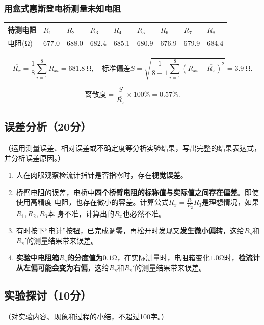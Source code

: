 \documentclass{../../templates/Report}%
\begin{document}
\begin{fullreportonly}
\subsubsection{用盒式惠斯登电桥测量未知电阻}
\begin{table}[H]
    \centering
    \begin{tabular}{|C{0.1\textwidth}|C{0.08\textwidth}|C{0.08\textwidth}|C{0.08\textwidth}|C{0.08\textwidth}|C{0.08\textwidth}|C{0.08\textwidth}|C{0.08\textwidth}|C{0.08\textwidth}|}
        \hline
        待测电阻 & $R_1$ & $R_2$ & $R_3$ & $R_4$ & $R_5$ & $R_6$ & $R_7$ & $R_8$ \\
        \hline
        电阻(\si{\ohm}) & 677.0 & 688.0 & 682.4 & 685.1 & 680.9 & 676.9 & 679.9 & 684.4 \\
        \hline
    \end{tabular}
\end{table}

\[
    \overline{R_x} = \frac{1}{8}\sum_{i=1}^{8} R_{xi} = \SI{681.8}{\ohm}, \quad \text{标准偏差} S = \sqrt{\frac{1}{8-1}\sum_{i=1}^{8}(R_{xi} - \overline{R_x})^2} = \SI{3.9}{\ohm}
.\]

\[
    \text{离散度} = \frac{S}{\overline{R_x}} \times 100\% = 0.57\%
.\]

\subsection{误差分析（20分）}
（运用测量误差、相对误差或不确定度等分析实验结果，写出完整的结果表达式，并分析误差原因。）
\begin{enumerate}
    \item  人在肉眼观察检流计指针是否指零时，存在\textbf{视觉误差}。
    \item 桥臂电阻的误差，电桥中\textbf{四个桥臂电阻的标称值与实际值之间存在偏差}。即使使用高精度
        电阻，也存在微小的容差。计算公式$R_x = \frac{R_1}{R_2} R_3$是理想情况，如果$R_1, R_2, R_3$本
        身不准，计算出的$R_x$也必然不准。
    \item 有时按下“电计”按钮，已完成调零，再松开时发现又\textbf{发生微小偏转}，这给$R_s$和$R_s'$的测量结果带来误差。
    \item \textbf{实验中电阻箱$R_s$的分度值为$0.1\si{\ohm}$}，在实际测量时，电阻箱变化$1.0\si{\ohm}$时，\textbf{检流计从左偏可能会变为右偏}，这给$R_s$和$R_s'$的测量结果带来误差。
\end{enumerate}
\subsection{实验探讨（10分）}
（对实验内容、现象和过程的小结，不超过100字。）


\end{fullreportonly}
\end{document}

